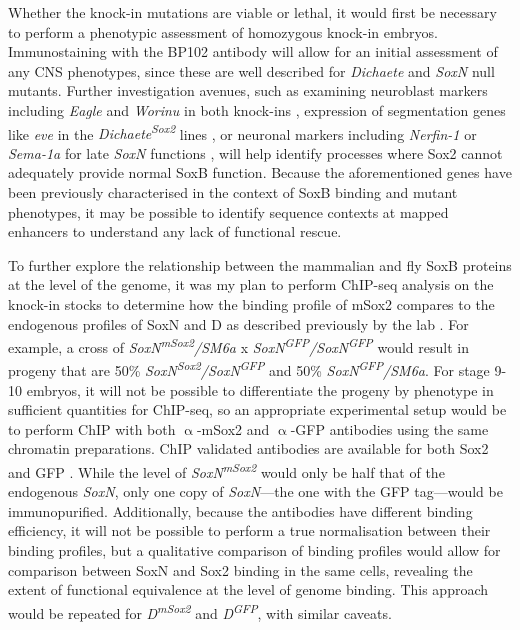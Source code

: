 \documentclass[withindex,glossary]{cam-thesis}
\begin{document}
Whether the knock-in mutations are viable or lethal, it would first be
necessary to perform a phenotypic assessment of homozygous knock-in
embryos. Immunostaining with the BP102 antibody will allow for an
initial assessment of any CNS phenotypes, since these are well described
for \emph{Dichaete} and \emph{SoxN} null mutants. Further investigation
avenues, such as examining neuroblast markers including \emph{Eagle} and \emph{Worinu}
in both knock-ins ,
expression of segmentation genes like \emph{eve} in the
\emph{Dichaete\textsuperscript{Sox2}} lines , or
neuronal markers including \emph{Nerfin-1} or \emph{Sema-1a} for late \emph{SoxN}
functions , will help identify processes where
Sox2 cannot adequately provide normal SoxB function. Because the
aforementioned genes have been previously characterised in the context
of SoxB binding and mutant phenotypes, it may be possible to identify
sequence contexts at mapped enhancers to understand any lack of
functional rescue.

To further explore the relationship between the mammalian and fly SoxB
proteins at the level of the genome, it was my plan to perform ChIP-seq
analysis on the knock-in stocks to determine how the binding profile of
mSox2 compares to the endogenous profiles of SoxN and D as described
previously by the lab . For
example, a cross of \emph{SoxN\textsuperscript{mSox2}/SM6a} x
\emph{SoxN\textsuperscript{GFP}/SoxN\textsuperscript{GFP}} would result
in progeny that are 50\%
\emph{SoxN\textsuperscript{Sox2}/SoxN\textsuperscript{GFP}} and 50\%
\emph{SoxN\textsuperscript{GFP}/SM6a}. For stage 9-10 embryos, it will
not be possible to differentiate the progeny by phenotype in sufficient
quantities for ChIP-seq, so an appropriate experimental setup would be
to perform ChIP with both $\upalpha$-mSox2 and $\upalpha$-GFP antibodies using the same
chromatin preparations. ChIP validated antibodies are available for both
Sox2 and GFP . While the
level of \emph{SoxN\textsuperscript{mSox2}} would only be half that of
the endogenous \emph{SoxN}, only one copy of \emph{SoxN}---the one with
the GFP tag---would be immunopurified. Additionally, because the
antibodies have different binding efficiency, it will not be possible to
perform a true normalisation between their binding profiles, but a
qualitative comparison of binding profiles would allow for comparison
between SoxN and Sox2 binding in the same cells, revealing the extent of
functional equivalence at the level of genome binding. This approach
would be repeated for \emph{D\textsuperscript{mSox2}} and
\emph{D\textsuperscript{GFP}}, with similar caveats.
\end{document}
